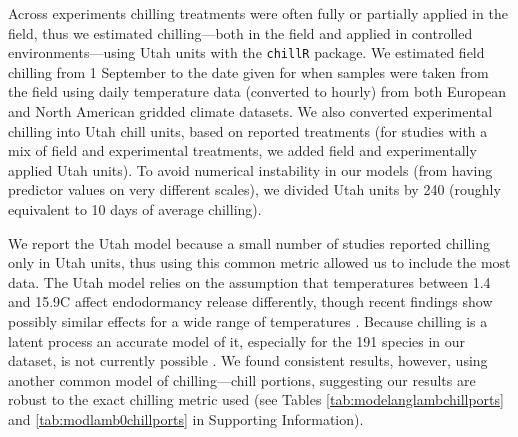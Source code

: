 \documentclass[11pt]{article}
\begin{document}
Across experiments chilling treatments were often fully or partially applied in the field, thus we estimated chilling---both in the field and applied in controlled environments---using Utah units with the \verb|chillR| package. We estimated field chilling from 1 September to the date given for when samples were taken from the field using daily temperature data (converted to hourly) from both European \citep[E-OBS, version 16, calculating the average of minimum and maximum daily temps,][]{cornes2018} and North American \citep[v3,][]{princetonclimate} gridded climate datasets. We also converted experimental chilling into Utah chill units, based on reported treatments (for studies with a mix of field and experimental treatments, we added field and experimentally applied Utah units). To avoid numerical instability in our models (from having predictor values on very different scales), we divided Utah units by 240 (roughly equivalent to 10 days of average chilling). 

We report the Utah model because a small number of studies reported chilling only in Utah units, thus using this common metric allowed us to include the most data. The Utah model relies on the assumption that temperatures between 1.4 and 15.9\degree C affect endodormancy release differently, though recent findings show possibly similar effects for a wide range of temperatures \citep[-2 to 10\degree C, see][]{baum2021}. Because chilling is a latent process an accurate model of it, especially for the 191 species in our dataset, is not currently possible \citep{ettinger2020}. We found consistent results, however, using another common model of chilling---chill portions, suggesting our results are robust to the exact chilling metric used (see Tables \ref{tab:modelanglambchillports} and \ref{tab:modlamb0chillports} in Supporting Information). %

\end{document}

